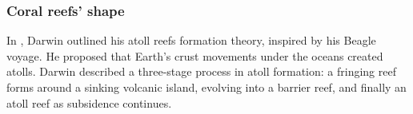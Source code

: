 


\subsubsection{Coral reefs' shape}
In \citep{Darwin1842}, Darwin outlined his atoll reefs formation theory, inspired by his Beagle voyage. He proposed that Earth's crust movements under the oceans created atolls. Darwin described a three-stage process in atoll formation: a fringing reef forms around a sinking volcanic island, evolving into a barrier reef, and finally an atoll reef as subsidence continues.

